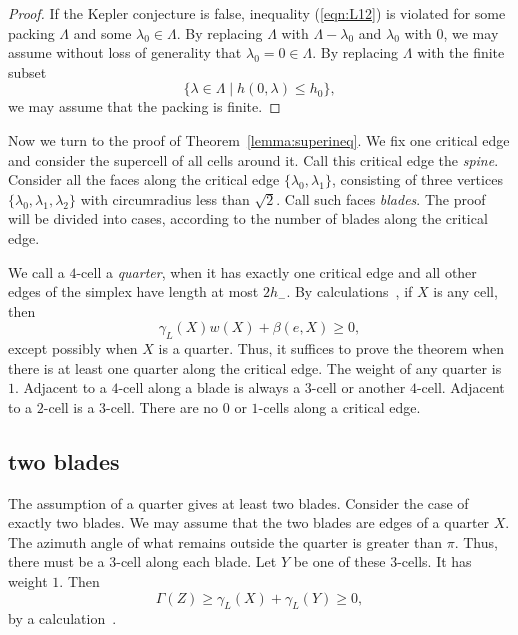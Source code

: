 \begin{proof} If the Kepler conjecture is false, inequality (\ref{eqn:L12}) is violated for some packing $\Lambda$ and some $\lambda_0\in\Lambda$.  By replacing $\Lambda$ with $\Lambda - \lambda_0$ and $\lambda_0$ with $0$, we may assume without loss of generality that $\lambda_0=0\in\Lambda$.  By replacing $\Lambda$ with the finite subset
$$
\{\lambda\in\Lambda\mid h(0,\lambda)\le h_0\},
$$
we may assume that the packing is finite.
\end{proof}


Now we turn to the proof of Theorem~\ref{lemma:superineq}. We fix one critical edge and consider the supercell of all cells around it.  Call this critical edge the {\it spine}.  Consider all the faces along the critical edge $\{\lambda_0,\lambda_1\}$, consisting of three vertices $\{\lambda_0,\lambda_1,\lambda_2\}$ with circumradius less than $\sqrt2$.  Call such faces {\it blades}.  The proof will be divided into cases, according to the number of blades along the critical edge.

We call a $4$-cell a {\it quarter}, when it has exactly one critical edge and all other edges of the simplex have length at most $2 h_-$. By calculations~\cite[cc:qtr:GLFVCVK]{hales:2009:nonlinear}, if $X$ is any cell, then %
$$
 \gamma_L(X) w(X) + \beta(e,X)\ge 0,
$$ 
except possibly when $X$ is a quarter.  Thus, it
suffices to prove the theorem
when there is at least one quarter along the critical
edge.  The weight of any quarter is $1$.
Adjacent to a $4$-cell along a blade is always a $3$-cell or another $4$-cell. Adjacent to a $2$-cell is a $3$-cell.  There are no $0$ or $1$-cells along a critical edge.



\subsection{two blades}

The assumption of a quarter gives at least two blades.  Consider
the case of exactly two blades.
We may assume that the two blades are edges of a quarter
$X$. 
The azimuth angle of what remains outside the quarter
is greater than $\pi$.  Thus, there must be a $3$-cell
along each blade.  Let $Y$ be one of these $3$-cells.
It has weight $1$.
Then 
\begin{equation}\label{eqn:34}
\Gamma(Z)\ge \gamma_L(X)+\gamma_L(Y)\ge 0,
\end{equation}
by a calculation~\cite[cc:2bl:FHBVYXZ]{hales:2009:nonlinear}. %

